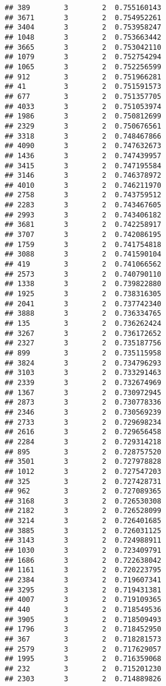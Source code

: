 \documentclass[
]{article}
\begin{document}
\begin{verbatim}
## 389        3        2  0.755160143
## 3671       3        2  0.754952261
## 3404       3        2  0.753958247
## 1048       3        2  0.753663442
## 3665       3        2  0.753042110
## 1079       3        2  0.752754294
## 1065       3        2  0.752256599
## 912        3        2  0.751966281
## 41         3        2  0.751591573
## 677        3        2  0.751357705
## 4033       3        2  0.751053974
## 1986       3        2  0.750812699
## 2329       3        2  0.750676561
## 3318       3        2  0.748467866
## 4090       3        2  0.747632673
## 1436       3        2  0.747439957
## 3415       3        2  0.747195584
## 3146       3        2  0.746378972
## 4010       3        2  0.746211970
## 2758       3        2  0.743759512
## 2283       3        2  0.743467605
## 2993       3        2  0.743406182
## 3681       3        2  0.742258917
## 3707       3        2  0.742086195
## 1759       3        2  0.741754818
## 3088       3        2  0.741590104
## 419        3        2  0.741066562
## 2573       3        2  0.740790110
## 1338       3        2  0.739822880
## 1925       3        2  0.738316305
## 2041       3        2  0.737742340
## 3888       3        2  0.736334765
## 135        3        2  0.736262424
## 3267       3        2  0.736172652
## 2327       3        2  0.735187756
## 899        3        2  0.735115958
## 3824       3        2  0.734796293
## 3103       3        2  0.733291463
## 2339       3        2  0.732674969
## 1367       3        2  0.730972945
## 2873       3        2  0.730778336
## 2346       3        2  0.730569239
## 2733       3        2  0.729698234
## 2616       3        2  0.729656458
## 2284       3        2  0.729314218
## 895        3        2  0.728757520
## 3501       3        2  0.727978828
## 1012       3        2  0.727547203
## 325        3        2  0.727428731
## 962        3        2  0.727089365
## 3168       3        2  0.726530308
## 2182       3        2  0.726528099
## 3214       3        2  0.726401685
## 3885       3        2  0.726031125
## 3143       3        2  0.724988911
## 1030       3        2  0.723409791
## 1686       3        2  0.722638042
## 1161       3        2  0.720223795
## 2384       3        2  0.719607341
## 3295       3        2  0.719431381
## 4007       3        2  0.719109365
## 440        3        2  0.718549536
## 3905       3        2  0.718509493
## 1796       3        2  0.718452950
## 367        3        2  0.718281573
## 2579       3        2  0.717629057
## 1995       3        2  0.716359068
## 232        3        2  0.715201230
## 2303       3        2  0.714889826

\end{verbatim}
\end{document}
